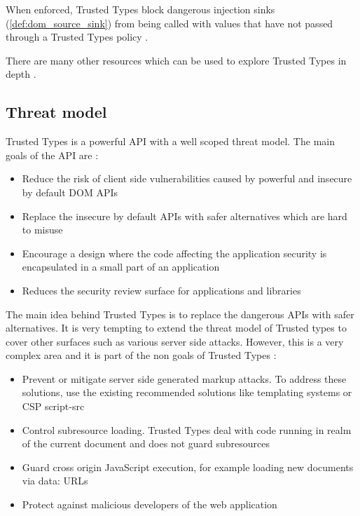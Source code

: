 When enforced, Trusted Types block dangerous injection sinks (\ref{def:dom_source_sink}) from being
called with values that have not passed through a Trusted Types policy \cite{tt_background}.

There are many other resources which can be used to explore Trusted Types in depth
\cite{tt_resources}.

\subsection{Threat model}

Trusted Types is a powerful API with a well scoped threat model. The main goals of the API are
\cite{tt_spec:goals}:

\begin{itemize}
  \item Reduce the risk of client side vulnerabilities caused by powerful and insecure by default
        DOM APIs
  \item Replace the insecure by default APIs with safer alternatives which are hard to misuse
  \item Encourage a design where the code affecting the application security is encapsulated in a
        small part of an application
  \item Reduces the security review surface for applications and libraries
\end{itemize}

The main idea behind Trusted Types is to replace the dangerous APIs with safer alternatives. It is
very tempting to extend the threat model of Trusted types to cover other surfaces such as various
server side attacks. However, this is a very complex area and it is part of the non goals of Trusted
Types \cite{tt_spec:non_goals}:

\begin{itemize}
  \item Prevent or mitigate server side generated markup attacks. To address these solutions, use
        the existing recommended solutions like templating systems or CSP script-src
  \item Control subresource loading. Trusted Types deal with code running in realm of the current
        document and does not guard subresources
  \item Guard cross origin JavaScript execution, for example loading new documents via data: URLs
  \item Protect against malicious developers of the web application
\end{itemize}

